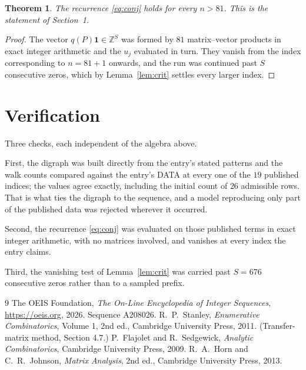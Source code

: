 \documentclass[11pt,a4paper]{article}
\theoremstyle{plain}
\newtheorem{theorem}{Theorem}
\theoremstyle{definition}
\begin{document}
\begin{theorem}
The recurrence \eqref{eq:conj} holds for every $n>81$. This is the statement of
Section~1.
\end{theorem}

\begin{proof}
The vector $q(P)\mathbf{1}\in\mathbb{Z}^{S}$ was formed by $81$ matrix--vector
products in exact integer arithmetic and the $u_j$ evaluated in turn. They vanish from the
index corresponding to $n=81+1$ onwards, and the run was continued past $S$ consecutive
zeros, which by Lemma~\ref{lem:crit} settles every larger index.
\end{proof}

\section{Verification}

Three checks, each independent of the algebra above.

First, the digraph was built directly from the entry's stated patterns and the walk counts
compared against the entry's DATA at every one of the $19$ published indices; the
values agree exactly, including the initial count of $26$ admissible rows. That is
what ties the digraph to the sequence, and a model reproducing only part of the published
data was rejected wherever it occurred.

Second, the recurrence \eqref{eq:conj} was evaluated on those published terms in exact
integer arithmetic, with no matrices involved, and vanishes at every index the entry claims.

Third, the vanishing test of Lemma~\ref{lem:crit} was carried past $S=676$ consecutive
zeros rather than to a sampled prefix.

\begin{thebibliography}{9}
 The OEIS Foundation, \emph{The On-Line Encyclopedia of Integer
Sequences}, \url{https://oeis.org}, 2026. Sequence A208026.
 R.~P.~Stanley, \emph{Enumerative Combinatorics}, Volume 1, 2nd ed.,
Cambridge University Press, 2011. (Transfer-matrix method, Section 4.7.)
 P.~Flajolet and R.~Sedgewick, \emph{Analytic Combinatorics}, Cambridge
University Press, 2009.
 R.~A.~Horn and C.~R.~Johnson, \emph{Matrix Analysis}, 2nd ed., Cambridge
University Press, 2013.
\end{thebibliography}
\end{document}
